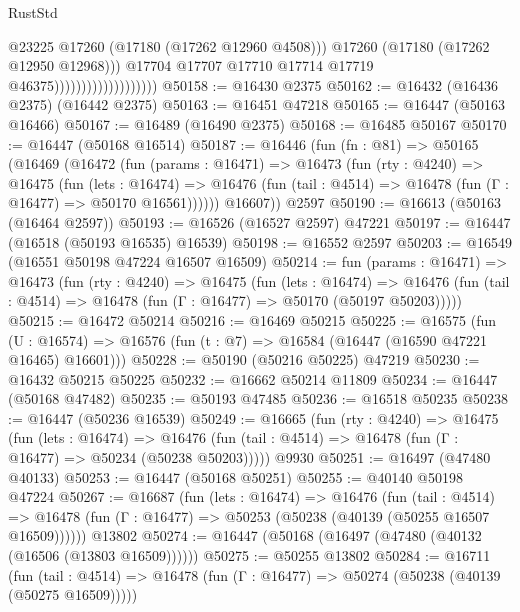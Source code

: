 \begin{lexlean}{RustStd}
\begin{coremodule}
{\begin{coremodule}
{{{{{{{{{{{{{{{{{{{{{{{{{{{{{{{{{{{{{{{{{{{{{{{{{{{{{{{                                              @23225
                                              @17260
                                              (@17180 (@17262 @12960 @4508)))
                                            @17260
                                            (@17180 (@17262 @12950 @12968)))
                                          @17704
                                          @17707
                                          @17710
                                          @17714
                                          @17719
                                          @46375)))))))))))))))))))
@50158 := @16430 @2375
@50162 := @16432 (@16436 @2375) (@16442 @2375)
@50163 := @16451 @47218
@50165 := @16447 (@50163 @16466)
@50167 := @16489 (@16490 @2375)
@50168 := @16485 @50167
@50170 := @16447 (@50168 @16514)
@50187 := @16446
    (fun (fn : @81) =>
    @50165
      (@16469
        (@16472
          (fun (params : @16471) =>
          @16473
            (fun (rty : @4240) =>
            @16475
              (fun (lets : @16474) =>
              @16476 (fun (tail : @4514) => @16478 (fun (Γ : @16477) => @50170 @16561))))))
        @16607))
    @2597
@50190 := @16613 (@50163 (@16464 @2597))
@50193 := @16526 (@16527 @2597) @47221
@50197 := @16447 (@16518 (@50193 @16535) @16539)
@50198 := @16552 @2597
@50203 := @16549 (@16551 @50198 @47224 @16507 @16509)
@50214 := fun (params : @16471) =>
  @16473
    (fun (rty : @4240) =>
    @16475
      (fun (lets : @16474) =>
      @16476 (fun (tail : @4514) => @16478 (fun (Γ : @16477) => @50170 (@50197 @50203)))))
@50215 := @16472 @50214
@50216 := @16469 @50215
@50225 := @16575
    (fun (U : @16574) => @16576 (fun (t : @7) => @16584 (@16447 (@16590 @47221 @16465) @16601)))
@50228 := @50190 (@50216 @50225) @47219
@50230 := @16432 @50215 @50225
@50232 := @16662 @50214 @11809
@50234 := @16447 (@50168 @47482)
@50235 := @50193 @47485
@50236 := @16518 @50235
@50238 := @16447 (@50236 @16539)
@50249 := @16665
    (fun (rty : @4240) =>
    @16475
      (fun (lets : @16474) =>
      @16476 (fun (tail : @4514) => @16478 (fun (Γ : @16477) => @50234 (@50238 @50203)))))
    @9930
@50251 := @16497 (@47480 @40133)
@50253 := @16447 (@50168 @50251)
@50255 := @40140 @50198 @47224
@50267 := @16687
    (fun (lets : @16474) =>
    @16476
      (fun (tail : @4514) =>
      @16478 (fun (Γ : @16477) => @50253 (@50238 (@40139 (@50255 @16507 @16509))))))
    @13802
@50274 := @16447 (@50168 (@16497 (@47480 (@40132 (@16506 (@13803 @16509))))))
@50275 := @50255 @13802
@50284 := @16711
    (fun (tail : @4514) => @16478 (fun (Γ : @16477) => @50274 (@50238 (@40139 (@50275 @16509)))))
}}}}}}}}}}}}}}}}}}}}}}}}}}}}}}}}}}}}}}}}}}}}}}}}}}}}}}}
\end{coremodule}}
\end{coremodule}
\end{lexlean}
